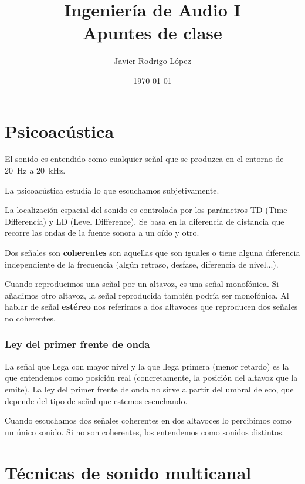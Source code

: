 \documentclass[10pt]{book}
\title{\Huge Ingeniería de Audio I\\\huge Apuntes de clase}
\author{Javier Rodrigo López}
\date{\today}
\begin{document}
\maketitle

\tableofcontents


\newpage

\chapter{Psicoacústica}

El sonido es entendido como cualquier señal que se produzca en el entorno de \SI{20}{\hertz} a \SI{20}{\kilo\hertz}.

La psicoacústica estudia lo que escuchamos subjetivamente.

La localización espacial del sonido es controlada por los parámetros TD (Time Differencia) y LD (Level Difference). Se basa en la diferencia de distancia que recorre las ondas de la fuente sonora a un oído y otro.

Dos señales son \textbf{coherentes} son aquellas que son iguales o tiene alguna diferencia independiente de la frecuencia (algún retraso, desfase, diferencia de nivel...).

Cuando reproducimos una señal por un altavoz, es una señal monofónica. Si añadimos otro altavoz, la señal reproducida también podría ser monofónica. Al hablar de señal \textbf{estéreo} nos referimos a dos altavoces que reproducen dos señales no coherentes.

\subsection{Ley del primer frente de onda}

La señal que llega con mayor nivel y la que llega primera (menor retardo) es la que entendemos como posición real (concretamente, la posición del altavoz que la emite). La ley del primer frente de onda no sirve a partir del umbral de eco, que depende del tipo de señal que estemos escuchando.

Cuando escuchamos dos señales coherentes en dos altavoces lo percibimos como un único sonido. Si no son coherentes, los entendemos como sonidos distintos.

\chapter{Técnicas de sonido multicanal}
\end{document}
